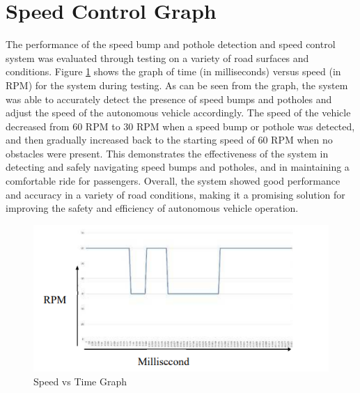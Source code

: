\section{Speed Control Graph}
The performance of the speed bump and pothole detection and speed control system was evaluated through testing on a variety of road surfaces and conditions. Figure \ref{fig:speedtime} shows the graph of time (in milliseconds) versus speed (in RPM) for the system during testing. As can be seen from the graph, the system was able to accurately detect the presence of speed bumps and potholes and adjust the speed of the autonomous vehicle accordingly. The speed of the vehicle decreased from 60 RPM to 30 RPM when a speed bump or pothole was detected, and then gradually increased back to the starting speed of 60 RPM when no obstacles were present. This demonstrates the effectiveness of the system in detecting and safely navigating speed bumps and potholes, and in maintaining a comfortable ride for passengers. Overall, the system showed good performance and accuracy in a variety of road conditions, making it a promising solution for improving the safety and efficiency of autonomous vehicle operation.
\begin{figure}[H]
    \centering
    \includegraphics{Figures/chapter4/speedtime.png}
    \caption{Speed vs Time Graph}
    \label{fig:speedtime}
\end{figure}
